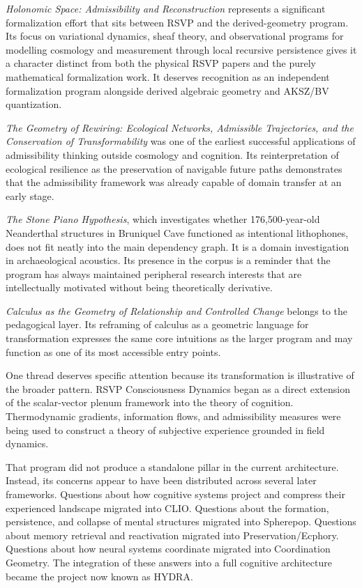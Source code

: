 \documentclass[12pt, twoside]{article}
\begin{document}
\emph{Holonomic Space: Admissibility and Reconstruction} represents a
significant formalization effort that sits between RSVP and the
derived-geometry program. Its focus on variational dynamics, sheaf theory,
and observational programs for modelling cosmology and measurement through
local recursive persistence gives it a character distinct from both the
physical RSVP papers and the purely mathematical formalization work. It
deserves recognition as an independent formalization program alongside
derived algebraic geometry and AKSZ/BV quantization.

\emph{The Geometry of Rewiring: Ecological Networks, Admissible Trajectories,
and the Conservation of Transformability} was one of the earliest successful
applications of admissibility thinking outside cosmology and cognition. Its
reinterpretation of ecological resilience as the preservation of navigable
future paths demonstrates that the admissibility framework was already capable
of domain transfer at an early stage.

\emph{The Stone Piano Hypothesis}, which investigates whether 176,500-year-old
Neanderthal structures in Bruniquel Cave functioned as intentional
lithophones, does not fit neatly into the main dependency graph. It is a
domain investigation in archaeological acoustics. Its presence in the corpus
is a reminder that the program has always maintained peripheral research
interests that are intellectually motivated without being theoretically
derivative.

\emph{Calculus as the Geometry of Relationship and Controlled Change} belongs
to the pedagogical layer. Its reframing of calculus as a geometric language
for transformation expresses the same core intuitions as the larger program
and may function as one of its most accessible entry points.

One thread deserves specific attention because its transformation is
illustrative of the broader pattern. RSVP Consciousness Dynamics began as a
direct extension of the scalar-vector plenum framework into the theory of
cognition. Thermodynamic gradients, information flows, and admissibility
measures were being used to construct a theory of subjective experience
grounded in field dynamics.

That program did not produce a standalone pillar in the current architecture.
Instead, its concerns appear to have been distributed across several later
frameworks. Questions about how cognitive systems project and compress their
experienced landscape migrated into CLIO. Questions about the formation,
persistence, and collapse of mental structures migrated into Spherepop.
Questions about memory retrieval and reactivation migrated into
Preservation/Ecphory. Questions about how neural systems coordinate migrated
into Coordination Geometry. The integration of these answers into a
full cognitive architecture became the project now known as HYDRA.
\end{document}
